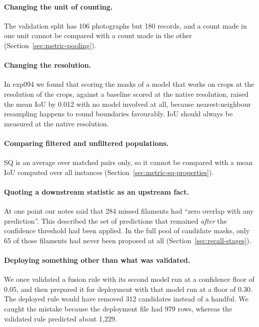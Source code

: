 \paragraph{Changing the unit of counting.} The validation split has 106 photographs but 180 records,
and a count made in one unit cannot be compared with a count made in the other
(Section~\ref{sec:metric-pooling}).

\paragraph{Changing the resolution.} In exp094 we found that scoring the masks of a model that works
on crops at the resolution of the crops, against a baseline scored at the native resolution, raised
the mean IoU by 0.012 with no model involved at all, because nearest-neighbour resampling happens to
round boundaries favourably. IoU should always be measured at the native resolution.

\paragraph{Comparing filtered and unfiltered populations.} SQ is an average over matched pairs only,
so it cannot be compared with a mean IoU computed over all instances
(Section~\ref{sec:metric-sq-properties}).

\paragraph{Quoting a downstream statistic as an upstream fact.} At one point our notes said that 284
missed filaments had ``zero overlap with any prediction''. This described the set of predictions
that remained \emph{after} the confidence threshold had been applied. In the full pool of candidate
masks, only 65 of those filaments had never been proposed at all
(Section~\ref{sec:recall-stages}).

\paragraph{Deploying something other than what was validated.} We once validated a fusion rule
with its second model run at a confidence floor of 0.05, and then prepared it for deployment with
that model run at a floor of 0.30. The deployed rule would have removed 312 candidates instead of a
handful. We caught the mistake because the deployment file had 979 rows, whereas the validated rule
predicted about 1,229.

